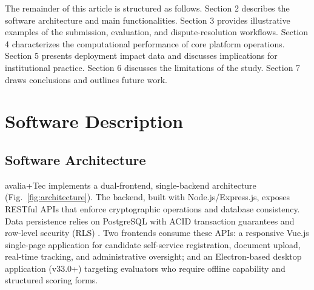 \documentclass[preprint,12pt,a4paper]{elsarticle}
\begin{document}
The remainder of this article is structured as follows. Section 2 describes the software architecture and main functionalities. Section 3 provides illustrative examples of the submission, evaluation, and dispute-resolution workflows. Section 4 characterizes the computational performance of core platform operations. Section 5 presents deployment impact data and discusses implications for institutional practice. Section 6 discusses the limitations of the study. Section 7 draws conclusions and outlines future work.

\section{Software Description}

\subsection{Software Architecture}

avalia+Tec implements a dual-frontend, single-backend architecture (Fig.~\ref{fig:architecture}). The backend, built with Node.js/Express.js, exposes RESTful APIs that enforce cryptographic operations and database consistency. Data persistence relies on PostgreSQL with ACID transaction guarantees and row-level security (RLS) \citep{ISO27001}. Two frontends consume these APIs: a responsive Vue.js single-page application for candidate self-service registration, document upload, real-time tracking, and administrative oversight; and an Electron-based desktop application (v33.0+) targeting evaluators who require offline capability and structured scoring forms.
\end{document}
